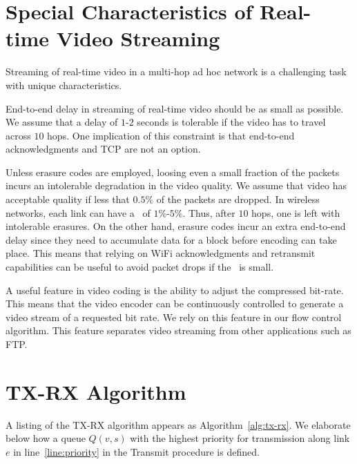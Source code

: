 \documentclass[11pt]{article}
\newenvironment{proof sketch}[1]{\noindent {\emph{Proof sketch of #1:}}}{\hfill \qed}
\newcommand{\PER}{\text{\sc{per}}}
\begin{document}
\section{Special Characteristics of Real-time Video Streaming}
Streaming of real-time video in a multi-hop ad hoc network is a
challenging task with unique characteristics.
\begin{inparaenum}[(1)]
\item End-to-end delay in streaming of real-time video should be as
  small as possible.  We assume that a delay of $1$-$2$ seconds is
  tolerable if the video has to travel across $10$ hops.  One
  implication of this constraint is that end-to-end acknowledgments
  and TCP are not an option.
\item Unless erasure codes are employed, loosing even a small fraction
  of the packets incurs an intolerable degradation in the video
  quality. We assume that video has acceptable quality if less that
  $0.5\%$ of the packets are dropped. In wireless networks, each link
  can have a \PER\ of $1\%$-$5\%$. Thus, after $10$ hops, one is left
  with intolerable erasures.  On the other hand, erasure codes incur
  an extra end-to-end delay since they need to accumulate data for a
  block before encoding can take place. This means that relying on
  WiFi acknowledgments and retransmit capabilities can be useful to
  avoid packet drops if the \PER\ is small.
\item A useful feature in video coding is the ability to adjust the
  compressed bit-rate. This means that the video encoder can be
  continuously controlled to generate a video stream of a requested
  bit rate. We rely on this feature in our flow control algorithm.
  This feature separates video streaming from other applications such
  as FTP.
\end{inparaenum}

\section{TX-RX Algorithm} \label{sec:algs} A listing of the TX-RX
algorithm appears as Algorithm~\ref{alg:tx-rx}.  We elaborate below
how a queue $Q(v,s)$ with the highest priority for transmission along
link $e$ in line~\ref{line:priority} in the Transmit procedure is
defined.
\end{document}
